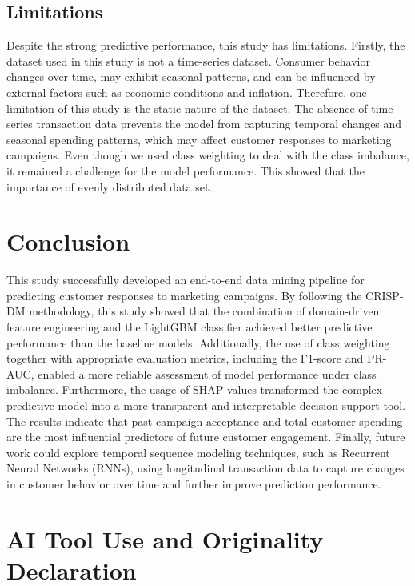 \documentclass[conference]{IEEEtran}
\begin{document}
\subsection{Limitations}
Despite the strong predictive performance, this study has limitations.
Firstly, the dataset used in this study is not a time-series dataset. 
Consumer behavior changes over time, may exhibit seasonal patterns, and can be influenced by external factors such as economic conditions and inflation. 
Therefore, one limitation of this study is the static nature of the dataset. 
The absence of time-series transaction data prevents the model from capturing temporal changes and seasonal spending patterns, which may affect customer responses to marketing campaigns.
Even though we used class weighting to deal with the class imbalance, it remained a challenge for the model performance. This showed that the importance of evenly distributed data set. 

\section{Conclusion}
\label{sec:conclusion}

This study successfully developed an end-to-end data mining pipeline for predicting customer responses to marketing campaigns. 
By following the CRISP-DM methodology, this study showed that the combination of domain-driven feature engineering and the LightGBM classifier achieved better predictive performance than the baseline models. 
Additionally, the use of class weighting together with appropriate evaluation metrics, including the F1-score and PR-AUC, enabled a more reliable assessment of model performance under class imbalance. 
Furthermore, the usage  of SHAP values transformed the complex predictive model into a more transparent and interpretable decision-support tool. 
The results indicate that past campaign acceptance and total customer spending are the most influential predictors of future customer engagement. 
Finally, future work could explore temporal sequence modeling techniques, such as Recurrent Neural Networks (RNNs), using longitudinal transaction data to capture changes in customer behavior over time and further improve prediction performance.



\section*{AI Tool Use and Originality Declaration}
\label{sec:ai_declaration}
\end{document}
